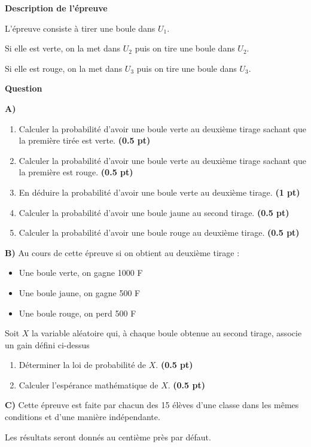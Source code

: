 \documentclass[12pt,a4paper]{article}
\begin{document}
\textbf{Description de l'épreuve}

L'épreuve consiste à tirer une boule dans $U_1$.

Si elle est verte, on la met dans $U_2$ puis on tire une boule dans $U_2$.

Si elle est rouge, on la met dans $U_3$ puis on tire une boule dans $U_3$.

\textbf{Question}

\textbf{A)} 
\begin{enumerate}
    \item Calculer la probabilité d'avoir une boule verte au deuxième tirage sachant que la première tirée est verte. \hfill \textbf{(0.5 pt)}
    \item Calculer la probabilité d'avoir une boule verte au deuxième tirage sachant que la première est rouge. \hfill \textbf{(0.5 pt)}
    \item En déduire la probabilité d'avoir une boule verte au deuxième tirage. \hfill \textbf{(1 pt)}
    \item Calculer la probabilité d'avoir une boule jaune au second tirage. \hfill \textbf{(0.5 pt)}
    \item Calculer la probabilité d'avoir une boule rouge au deuxième tirage. \hfill \textbf{(0.5 pt)}
\end{enumerate}

\textbf{B)} Au cours de cette épreuve si on obtient au deuxième tirage :

\begin{itemize}
    \item Une boule verte, on gagne 1000 F
    \item Une boule jaune, on gagne 500 F
    \item Une boule rouge, on perd 500 F
\end{itemize}
    Soit $X$ la variable aléatoire qui, à chaque boule obtenue au second tirage, associe un gain défini ci-dessus
\begin{enumerate}
    \item Déterminer la loi de probabilité de $X$. \hfill \textbf{(0.5 pt)}
    \item Calculer l'espérance mathématique de $X$. \hfill \textbf{(0.5 pt)}
\end{enumerate}

\textbf{C)} Cette épreuve est faite par chacun des 15 élèves d'une classe dans les mêmes conditions et d'une manière indépendante.

Les résultats seront donnés au centième près par défaut.
\end{document}
